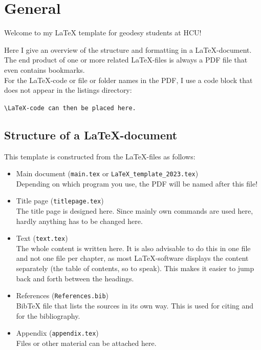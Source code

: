 \section{General} \label{sec:firstSec}

Welcome to my \LaTeX{} template for geodesy students at HCU!

Here I give an overview of the structure and formatting in a \LaTeX-document. The end product of one or more related \LaTeX-files is always a PDF file that even contains bookmarks.\\

For the \LaTeX-code or file or folder names in the PDF, I use a code block that does not appear in the listings directory:

\verb|\LaTeX-code can then be placed here.|


\subsection{Structure of a \LaTeX-document} \label{sec:structure}

This template is constructed from the \LaTeX-files as follows:

\begin{itemize}
    \item Main document (\verb|main.tex| or \verb|LaTeX_template_2023.tex|)\\
    Depending on which program you use, the PDF will be named after this file!
    \item Title page (\verb|titlepage.tex|)\\
    The title page is designed here. Since mainly own commands are used here, hardly anything has to be changed here.
    \item Text (\verb|text.tex|)\\
    The whole content is written here. It is also advisable to do this in one file and not one file per chapter, as most \LaTeX-software displays the content separately (the table of contents, so to speak). This makes it easier to jump back and forth between the headings.
    \item References (\verb|References.bib|)\\
    BibTeX file that lists the sources in its own way. This is used for citing and for the bibliography.
    \item Appendix (\verb|appendix.tex|)\\
    Files or other material can be attached here.
\end{itemize}

